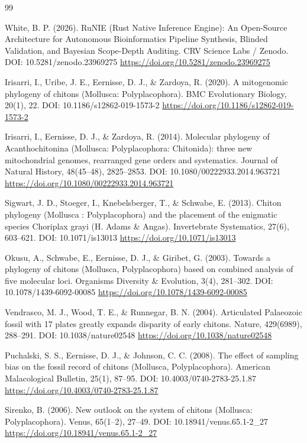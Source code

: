 \documentclass[11pt]{article}
\begin{document}
\begin{thebibliography}{99}

White, B. P. (2026). RuNIE (Rust Native Inference Engine): An Open-Source Architecture for Autonomous Bioinformatics Pipeline Synthesis, Blinded Validation, and Bayesian Scope-Depth Auditing. CRV Science Labs / Zenodo. DOI: 10.5281/zenodo.23969275 \url{https://doi.org/10.5281/zenodo.23969275}

Irisarri, I., Uribe, J. E., Eernisse, D. J., \& Zardoya, R. (2020). A mitogenomic phylogeny of chitons (Mollusca: Polyplacophora). BMC Evolutionary Biology, 20(1), 22. DOI: 10.1186/s12862-019-1573-2 \url{https://doi.org/10.1186/s12862-019-1573-2}

Irisarri, I., Eernisse, D. J., \& Zardoya, R. (2014). Molecular phylogeny of Acanthochitonina (Mollusca: Polyplacophora: Chitonida): three new mitochondrial genomes, rearranged gene orders and systematics. Journal of Natural History, 48(45--48), 2825--2853. DOI: 10.1080/00222933.2014.963721 \url{https://doi.org/10.1080/00222933.2014.963721}

Sigwart, J. D., Stoeger, I., Knebelsberger, T., \& Schwabe, E. (2013). Chiton phylogeny (Mollusca : Polyplacophora) and the placement of the enigmatic species Choriplax grayi (H. Adams \& Angas). Invertebrate Systematics, 27(6), 603--621. DOI: 10.1071/is13013 \url{https://doi.org/10.1071/is13013}

Okusu, A., Schwabe, E., Eernisse, D. J., \& Giribet, G. (2003). Towards a phylogeny of chitons (Mollusca, Polyplacophora) based on combined analysis of five molecular loci. Organisms Diversity \& Evolution, 3(4), 281--302. DOI: 10.1078/1439-6092-00085 \url{https://doi.org/10.1078/1439-6092-00085}

Vendrasco, M. J., Wood, T. E., \& Runnegar, B. N. (2004). Articulated Palaeozoic fossil with 17 plates greatly expands disparity of early chitons. Nature, 429(6989), 288--291. DOI: 10.1038/nature02548 \url{https://doi.org/10.1038/nature02548}

Puchalski, S. S., Eernisse, D. J., \& Johnson, C. C. (2008). The effect of sampling bias on the fossil record of chitons (Mollusca, Polyplacophora). American Malacological Bulletin, 25(1), 87--95. DOI: 10.4003/0740-2783-25.1.87 \url{https://doi.org/10.4003/0740-2783-25.1.87}

Sirenko, B. (2006). New outlook on the system of chitons (Mollusca: Polyplacophora). Venus, 65(1--2), 27--49. DOI: 10.18941/venus.65.1-2\_27 \url{https://doi.org/10.18941/venus.65.1-2\_27}


\end{thebibliography}
\end{document}
